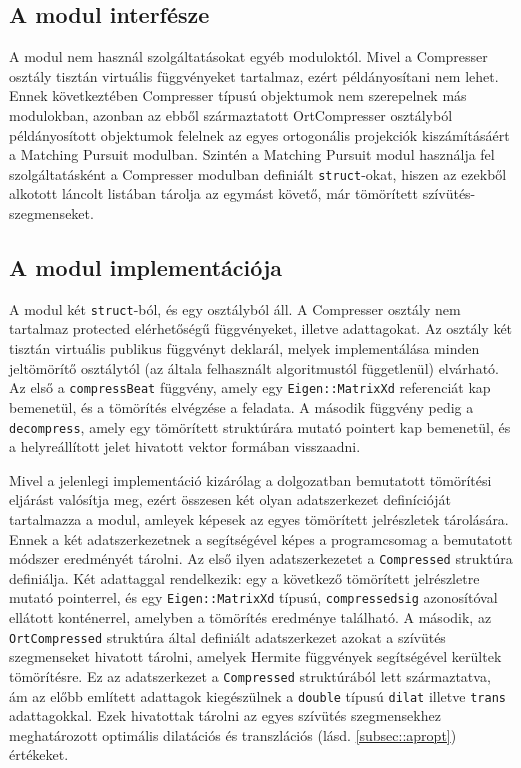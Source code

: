 \documentclass[oneside,titlepage,12pt,a4paper]{report}
\begin{document}
\subsection*{A modul interfésze}

\par A modul nem használ szolgáltatásokat egyéb moduloktól. Mivel a Compresser osztály tisztán virtuális függvényeket tartalmaz, ezért példányosítani nem lehet. Ennek következtében Compresser típusú objektumok nem szerepelnek más modulokban, azonban az ebből származtatott OrtCompresser osztályból példányosított objektumok felelnek az egyes ortogonális projekciók kiszámításáért a Matching Pursuit modulban. Szintén a Matching Pursuit modul használja fel szolgáltatásként a Compresser modulban definiált \texttt{struct}-okat, hiszen az ezekből alkotott láncolt listában tárolja az egymást követő, már tömörített szívütés-szegmenseket. 

\subsection*{A modul implementációja}

\par A modul két \texttt{struct}-ból, és egy osztályból áll. A Compresser osztály nem tartalmaz protected elérhetőségű függvényeket, illetve adattagokat. Az osztály két tisztán virtuális publikus függvényt deklarál, melyek implementálása minden jeltömörítő osztálytól (az általa felhasznált algoritmustól függetlenül) elvárható. Az első a \texttt{compressBeat} függvény, amely egy \texttt{Eigen::MatrixXd} referenciát kap bemenetül, és a tömörítés elvégzése a feladata. A második függvény pedig a \texttt{decompress}, amely egy tömörített struktúrára mutató pointert kap bemenetül, és a helyreállított jelet hivatott vektor formában visszaadni. 
\par Mivel a jelenlegi implementáció kizárólag a dolgozatban bemutatott tömörítési eljárást valósítja meg, ezért összesen két olyan adatszerkezet definícióját tartalmazza a modul, amleyek képesek az egyes tömörített jelrészletek tárolására. Ennek a két adatszerkezetnek a segítségével képes a programcsomag a bemutatott módszer eredményét tárolni. Az első ilyen adatszerkezetet a \texttt{Compressed} struktúra definiálja. Két adattaggal rendelkezik: egy a következő tömörített jelrészletre mutató pointerrel, és egy \texttt{Eigen::MatrixXd} típusú, \texttt{compressedsig} azonosítóval ellátott konténerrel, amelyben a tömörítés eredménye található. A második, az \texttt{OrtCompressed} struktúra által definiált adatszerkezet azokat a szívütés szegmenseket hivatott tárolni, amelyek Hermite függvények segítségével kerültek tömörítésre. Ez az adatszerkezet a \texttt{Compressed} struktúrából lett származtatva, ám az előbb említett adattagok kiegészülnek a \texttt{double} típusú \texttt{dilat} illetve \texttt{trans} adattagokkal. Ezek hivatottak tárolni az egyes szívütés szegmensekhez meghatározott optimális dilatációs és transzlációs (lásd. \ref{subsec::apropt}) értékeket.     
\end{document}
